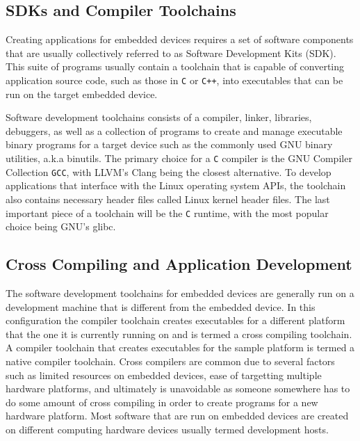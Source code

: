 
\subsection{SDKs and Compiler Toolchains}

Creating applications for embedded devices requires a set of software components that are usually collectively referred to as Software Development Kits (SDK). This suite of programs usually contain a toolchain that is capable of converting application source code, such as those in \texttt{C}  or \texttt{C++}, into executables that can be run on the target embedded device.

Software development toolchains consists of a compiler, linker, libraries, debuggers, as well as a collection of programs to create and manage executable binary programs for a target device such as the commonly used GNU binary utilities, a.k.a binutils. The primary choice for a \texttt{C} compiler is the GNU Compiler Collection \texttt{GCC}, with LLVM's Clang being the closest alternative. To develop applications that interface with the Linux operating system APIs, the toolchain also contains necessary header files called Linux kernel header files. The last important piece of a toolchain will be the \texttt{C} runtime, with the most popular choice being GNU's glibc.

\subsection{Cross Compiling and Application Development}

The software development toolchains for embedded devices are generally run on a development machine that is different from the embedded device. In this configuration the compiler toolchain creates executables for a different platform that the one it is currently running on and is termed a cross compiling toolchain. A compiler toolchain that creates executables for the sample platform is termed a native compiler toolchain. Cross compilers are common due to several factors such as limited resources on embedded devices, ease of targetting multiple hardware platforms, and ultimately is unavoidable as someone somewhere has to do some amount of cross compiling in order to create programs for a new hardware platform. Most software that are run on embedded devices are created on different computing hardware devices usually termed development hosts.

